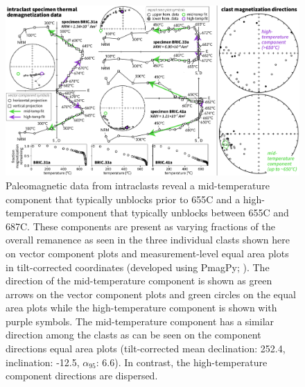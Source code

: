 \documentclass[draft]{agujournal2018}
\begin{document}
\begin{figure}[!ht]
\noindent\includegraphics[width=\textwidth]{figures/BRIC_pmag.pdf}
\caption{\small{Paleomagnetic data from intraclasts reveal a mid-temperature component that typically unblocks prior to 655\textdegree C and a high-temperature component that typically unblocks between 655\textdegree C and 687\textdegree C. These components are present as varying fractions of the overall remanence as seen in the three individual clasts shown here on vector component plots and measurement-level equal area plots in tilt-corrected coordinates (developed using PmagPy; \citealp{Tauxe2016a}). The direction of the mid-temperature component is shown as green arrows on the vector component plots and green circles on the equal area plots while the high-temperature component is shown with purple symbols. The mid-temperature component has a similar direction among the clasts as can be seen on the component directions equal area plots (tilt-corrected mean declination: 252.4, inclination: -12.5, $\alpha_{95}$: 6.6). In contrast, the high-temperature component directions are dispersed.}}
\label{fig:intraclast_pmag}
\end{figure}
\end{document}
